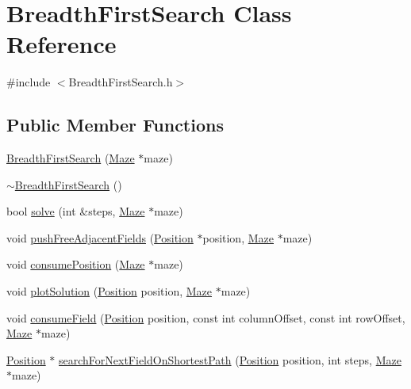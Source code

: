 \hypertarget{class_breadth_first_search}{\section{Breadth\-First\-Search Class Reference}
\label{class_breadth_first_search}
}


{\ttfamily \#include $<$Breadth\-First\-Search.\-h$>$}

\subsection*{Public Member Functions}
\begin{DoxyCompactItemize}
\item 
\hyperlink{class_breadth_first_search_aa2eb988878d47abbb9a75de86dd3ccb6}{Breadth\-First\-Search} (\hyperlink{class_maze}{Maze} $\ast$maze)
\item 
\hyperlink{class_breadth_first_search_af56e60466779aa47b1b3c10a1a84d8ca}{$\sim$\-Breadth\-First\-Search} ()
\item 
bool \hyperlink{class_breadth_first_search_a76cba5b073874b17548a1fc7f427b0ba}{solve} (int \&steps, \hyperlink{class_maze}{Maze} $\ast$maze)
\item 
void \hyperlink{class_breadth_first_search_a3c2f4c387d1c9d7b2b77cd21b7cd5eaf}{push\-Free\-Adjacent\-Fields} (\hyperlink{class_position}{Position} $\ast$position, \hyperlink{class_maze}{Maze} $\ast$maze)
\item 
void \hyperlink{class_breadth_first_search_af9c4a8b5c59e843cef67ec233c565814}{consume\-Position} (\hyperlink{class_maze}{Maze} $\ast$maze)
\item 
void \hyperlink{class_breadth_first_search_ae8a209ef80bcdb071197ff2513b81342}{plot\-Solution} (\hyperlink{class_position}{Position} position, \hyperlink{class_maze}{Maze} $\ast$maze)
\item 
void \hyperlink{class_breadth_first_search_a87842502342c4e7390f7908df1735881}{consume\-Field} (\hyperlink{class_position}{Position} position, const int column\-Offset, const int row\-Offset, \hyperlink{class_maze}{Maze} $\ast$maze)
\item 
\hyperlink{class_position}{Position} $\ast$ \hyperlink{class_breadth_first_search_a4b0b6aa9f4b8b8604924e7cddd19f809}{search\-For\-Next\-Field\-On\-Shortest\-Path} (\hyperlink{class_position}{Position} position, int steps, \hyperlink{class_maze}{Maze} $\ast$maze)
\end{DoxyCompactItemize}
